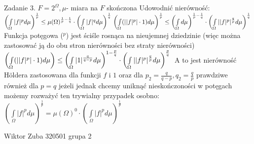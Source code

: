 \documentclass{article}
\begin{document}
Zadanie 3.
\newline
\newline
$F=2^{\Omega},\mu$- miara na $F$ skończona\newline
Udowodnić nierówność:\newline
$
\left(\int\limits_{\Omega}|f|^pd\mu\right)^{\frac{1}{p}}\le\mu{(\Omega)}^{\frac{1}{p}-\frac{1}{q}}\cdot\left(\int\limits_{\Omega}|f|^qd\mu\right)^{\frac{1}{q}}\newline
\left(\int\limits_{\Omega}(||f|^p|\cdot1)d\mu\right)^{\frac{1}{p}}\le\left(\int\limits_{\Omega}d\mu\right)^{\frac{1}{p}-\frac{1}{q}}\cdot\left(\int\limits_{\Omega}||f|^p|^{\frac{q}{p}}d\mu\right)^{\frac{1}{q}}\newline
$
Funkcja potęgowa ($^p$) jest ściśle rosnąca na nieujemnej dziedzinie (więc można zastosować ją do obu stron nierówności bez straty nierówności)\newline
$
\left(\int\limits_{\Omega}(||f|^p|\cdot1)d\mu\right)\le\left(\int\limits_{\Omega}|1|^{\frac{q}{q-p}}d\mu\right)^{1-\frac{p}{q}}\cdot\left(\int\limits_{\Omega}||f|^p|^{\frac{q}{p}}d\mu\right)^{\frac{p}{q}}\newline
$
A to jest nierówność H\"{o}ldera zastosowana dla funkcji $f$ i $1$ oraz dla $p_2=\frac{q}{q-p},q_2=\frac{q}{p}$
prawdziwe również dla $p=q$ jeżeli jednak chcemy uniknąć nieskończoności w potęgach możemy rozważyć ten trywialny przypadek osobno:$
\left(\int\limits_{\Omega}|f|^pd\mu\right)^{\frac{1}{p}}=\mu{(\Omega)}^{0}\cdot\left(\int\limits_{\Omega}|f|^pd\mu\right)^{\frac{1}{p}}$\newpage

Wiktor Zuba 320501 grupa 2
\newline
\end{document}
